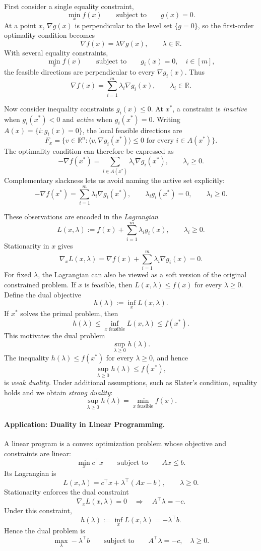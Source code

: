 \documentclass[11pt]{article}
\newcommand{\R}{\mathbb{R}}
\begin{document}
First consider a single equality constraint,
\[
  \min_x f(x)\qquad\text{subject to}\qquad g(x)=0.
\]
At a point $x$, $\nabla g(x)$ is perpendicular to the level set $\{g=0\}$,
so the first-order optimality condition becomes
\[
  \nabla f(x)=\lambda\nabla g(x),\qquad\lambda\in\R.
\]
With several equality constraints,
\[
  \min_x f(x)\qquad\text{subject to}\qquad
  g_i(x)=0,\quad i\in[m],
\]
the feasible directions are perpendicular to every $\nabla g_i(x)$. Thus
\[
  \nabla f(x)=\sum_{i=1}^m\lambda_i\nabla g_i(x),
  \qquad\lambda_i\in\R.
\]

Now consider inequality constraints $g_i(x)\leq0$. At $x^*$, a constraint is
\emph{inactive} when $g_i(x^*)<0$ and \emph{active} when $g_i(x^*)=0$.
Writing $A(x)=\{i:g_i(x)=0\}$, the local feasible directions are
\[
  F_x=\{v\in\R^n:\langle v,\nabla g_i(x^*)\rangle\leq0
  \text{ for every }i\in A(x^*)\}.
\]
The optimality condition can therefore be expressed as
\[
  -\nabla f(x^*)=
  \sum_{i\in A(x^*)}\lambda_i\nabla g_i(x^*),
  \qquad\lambda_i\geq0.
\]
Complementary slackness lets us avoid naming the active set explicitly:
\[
  -\nabla f(x^*)=\sum_{i=1}^m\lambda_i\nabla g_i(x^*),
  \qquad
  \lambda_i g_i(x^*)=0,
  \qquad\lambda_i\geq0.
\]

These observations are encoded in the \emph{Lagrangian}
\[
  L(x,\lambda):=f(x)+\sum_{i=1}^m\lambda_i g_i(x),
  \qquad\lambda_i\geq0.
\]
Stationarity in $x$ gives
\[
  \nabla_xL(x,\lambda)
  =\nabla f(x)+\sum_{i=1}^m\lambda_i\nabla g_i(x)=0.
\]
For fixed $\lambda$, the Lagrangian can also be viewed as a soft version of the
original constrained problem. If $x$ is feasible, then
$L(x,\lambda)\leq f(x)$ for every $\lambda\geq0$. Define the dual objective
\[
  h(\lambda):=\inf_xL(x,\lambda).
\]
If $x^*$ solves the primal problem, then
\[
  h(\lambda)
  \leq\inf_{x\text{ feasible}}L(x,\lambda)
  \leq f(x^*).
\]
This motivates the dual problem
\[
  \sup_{\lambda\geq0}h(\lambda).
\]
The inequality $h(\lambda)\leq f(x^*)$ for every $\lambda\geq0$, and hence
\[
  \sup_{\lambda\geq0}h(\lambda)\leq f(x^*),
\]
is \emph{weak duality}. Under additional assumptions, such as Slater's
condition, equality holds and we obtain \emph{strong duality}:
\[
  \sup_{\lambda\geq0}h(\lambda)
  =\min_{x\text{ feasible}}f(x).
\]

\paragraph{Application: Duality in Linear Programming.}

A linear program is a convex optimization problem whose objective and
constraints are linear:
\[
  \min_x c^\top x\qquad\text{subject to}\qquad Ax\leq b.
\]
Its Lagrangian is
\[
  L(x,\lambda)=c^\top x+\lambda^\top(Ax-b),
  \qquad\lambda\geq0.
\]
Stationarity enforces the dual constraint
\[
  \nabla_xL(x,\lambda)=0
  \quad\Longrightarrow\quad
  A^\top\lambda=-c.
\]
Under this constraint,
\[
  h(\lambda):=\inf_xL(x,\lambda)=-\lambda^\top b.
\]
Hence the dual problem is
\[
  \max_\lambda-\lambda^\top b
  \qquad\text{subject to}\qquad
  A^\top\lambda=-c,
  \quad\lambda\geq0.
\]
\end{document}
